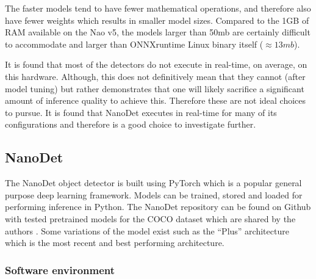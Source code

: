 \documentclass[a4paper,twoside,12pt]{report}
\begin{document}
The faster models tend to have fewer mathematical operations, and therefore also have fewer weights which results in smaller model sizes. Compared to the 1GB of RAM available on the Nao v5, the models larger than 50mb are certainly difficult to accommodate and larger than ONNXruntime Linux binary itself ($\approx13mb$).


It is found that most of the detectors do not execute in real-time, on average, on this hardware. Although, this does not definitively mean that they cannot (after model tuning) but rather demonstrates that one will likely sacrifice a significant amount of inference quality to achieve this. Therefore these are not ideal choices to pursue. It is found that NanoDet executes in real-time for many of its configurations and therefore is a good choice to investigate further.

\subsection{NanoDet}

The NanoDet object detector is built using PyTorch which is a popular general purpose deep learning framework. Models can be trained, stored and loaded for performing inference in Python. The NanoDet repository can be found on Github with tested pretrained models for the COCO dataset which are shared by the authors \citep{nanodet}. Some variations of the model exist such as the ``Plus'' architecture which is the most recent and best performing architecture.


\subsubsection{Software environment}
\end{document}
